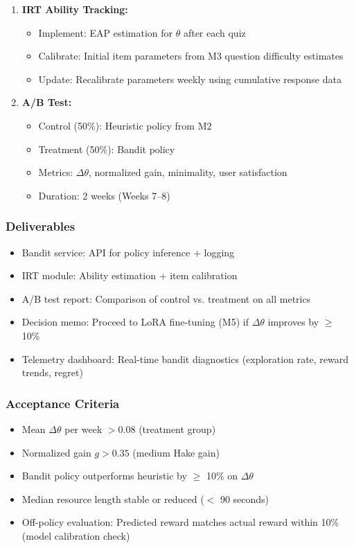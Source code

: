 \documentclass[11pt,letterpaper]{article}
\begin{document}
\begin{enumerate}
\item \textbf{IRT Ability Tracking:}
\begin{itemize}
\item Implement: EAP estimation for $\theta$ after each quiz
\item Calibrate: Initial item parameters from M3 question difficulty estimates
\item Update: Recalibrate parameters weekly using cumulative response data
\end{itemize}

\item \textbf{A/B Test:}
\begin{itemize}
\item Control (50\%): Heuristic policy from M2
\item Treatment (50\%): Bandit policy
\item Metrics: $\Delta\theta$, normalized gain, minimality, user satisfaction
\item Duration: 2 weeks (Weeks 7--8)
\end{itemize}
\end{enumerate}

\subsubsection{Deliverables}
\begin{itemize}
\item Bandit service: API for policy inference + logging
\item IRT module: Ability estimation + item calibration
\item A/B test report: Comparison of control vs. treatment on all metrics
\item Decision memo: Proceed to LoRA fine-tuning (M5) if $\Delta\theta$ improves by $\geq$ 10\%
\item Telemetry dashboard: Real-time bandit diagnostics (exploration rate, reward trends, regret)
\end{itemize}

\subsubsection{Acceptance Criteria}
\begin{itemize}
\item Mean $\Delta\theta$ per week $> 0.08$ (treatment group)
\item Normalized gain $g > 0.35$ (medium Hake gain)
\item Bandit policy outperforms heuristic by $\geq$ 10\% on $\Delta\theta$
\item Median resource length stable or reduced ($<$ 90 seconds)
\item Off-policy evaluation: Predicted reward matches actual reward within 10\% (model calibration check)
\end{itemize}
\end{document}

